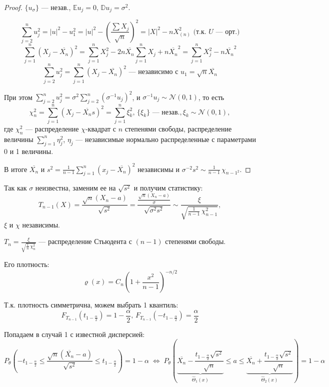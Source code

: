 \begin{enumerate}
\begin{proof}
		$\{ u_{\sigma} \}$ --- незав., $\mathbb{E} u_j = 0, \, \mathbb{D} u_j = \sigma^2$.
		
		\[ \sum_{j=2}^n u_j^2 = |u|^2 - u_1^2 = |u|^2 - \left( \frac{\sum X_j}{\sqrt{n}} \right)^2 = |X|^2 - nX^2_{(n)} \text{ (т.к. $U$ --- орт.)} \]
		\[ \sum_{j=1}^n (X_j - \overline{X_n})^2 = \sum_{j=1}^n X_j^2 - 2n \overline{X_n} \sum_{j=1}^n X_j + n\overline{X_n}^2 = \sum_{j=1}^n X_j^2 - n\overline{X_n}^2 \]
		\[ \sum_{j=2}^n u_j^2 = \sum_{j=1}^n (X_j - \overline{X_n})^2 \text{ --- независимо с } u_1 = \sqrt{n} \overline{X_n} \]
		
		При этом $\sum_{j=2}^n u_j^2 = \sigma^2 \sum_{j=2}^n (\sigma^{-1} u_j)^2$, и $\sigma^{-1} u_j \sim \mathcal{N}(0, 1)$, то есть
		\[ \chi_n^2 = \sum_{j=1}^n (X_j - \overline{X_n}s)^2 = \sum_{j=1}^n \xi_k^2, \, \{ \xi_k \} \text{ --- незав.}, \xi_k \sim \mathcal{N}(0, 1), \]
		где $\chi_n^2$ --- распределение $\chi$-квадрат с $n$ степенями свободы, распределение величины $\sum_{j=1}^n \eta_j^2$, $\eta_j$ --- независимые нормально распределенные с параметрами 0 и 1 величины.
		
		В итоге $\overline{X_n}$ и $s^2 = \frac1{n-1} \sum_{j=1}^n (x_j - \overline{X_n})^2$ независимы и $\sigma^{-2}s^2 \sim \frac1{n-1}\,\chi_{n-1^2}$.
	\end{proof}
	
	Так как $\sigma$ неизвестна, заменим ее на $\sqrt{s^2}$ и получим статистику:
	\[ T_{n-1}(X) = \frac{\sqrt{n}(X_n - a)}{\sqrt{s^2}} = \frac{\frac{\sqrt{n}(X_n - a)}{\sigma}}{\sqrt{\sigma^2 s^2}} \sim \frac{\xi}{\sqrt{\frac1{n-1}\,\chi^2_{n-1}}}, \]
	$\xi$ и $\chi$ независимы.
	
	$T_{n} = \frac{\xi}{\sqrt{\frac1n\,\chi_n^2}}$ --- распределение Стьюдента с $(n-1)$ степенями свободы.
	
	Его плотность:
	\[ \varrho(x) = C_n \left( 1 + \frac{x^2}{n-1} \right)^{-n/2} \]
 	
	Т.к. плотность симметрична, можем выбрать 1 квантиль:
	\[ F_{T_{n-1}}(t_{1 - \frac{\alpha}2}) = 1 - \frac{\alpha}2, \, F_{T_{n-1}}(-t_{1 - \frac{\alpha}2}) = \frac{\alpha}2 \]
	
	Попадаем в случай 1 с известной дисперсией:
	\[ P_{\theta} \left( -t_{1 - \frac{\alpha}2} \le \frac{\sqrt{n}(\overline{X_n} - a)}{\sqrt{s^2}} \le t_{1 - \frac{\alpha}2} \right) = 
	1 - \alpha \;\Leftrightarrow\; 
	P_{\theta} \left( \underset{\hat\Theta_1(x)}{\underbrace{\overline{X_n} - \frac{t_{1 - \frac{\alpha}2} \sqrt{s^2}}{\sqrt{n}}}} \le a \le 
	\underset{\hat\Theta_2(x)}{\underbrace{\overline{X_n} + \frac{t_{1 - \frac{\alpha}2} \sqrt{s^2}}{\sqrt{n}}}} \right) = 1 - \alpha \]
\end{enumerate}
